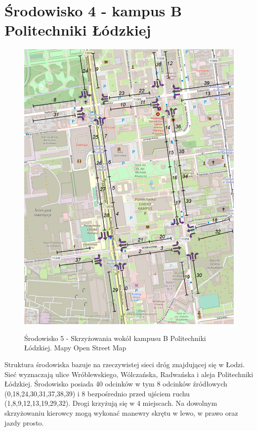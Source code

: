\documentclass[12pt]{book}
\theoremstyle{plain}
\begin{document}
\section{Środowisko 4 - kampus B Politechniki Łódzkiej}
\begin{figure}[H]
	\centering
	\includegraphics[width=12cm]{images/env_poli_italic2}
	\label{fig:env_poli}
	\centering
	\caption{Środowisko 5 - Skrzyżowania wokół kampusu B Politechniki Łódzkiej. Mapy Open Street Map \cite{OpenStreetMap}}
\end{figure}
Struktura środowiska bazuje na rzeczywistej sieci dróg znajdującej się w Łodzi. Sieć wyznaczają ulice Wróblewskiego, Wólczańska, Radwańska i aleja Politechniki Łódzkiej. Środowisko posiada 40 odcinków w tym 8 odcinków źródłowych (0,18,24,30,31,37,38,39) i 8 bezpośrednio przed ujściem ruchu (1,8,9,12,13,19,29,32). Drogi krzyżują się w 4 miejscach. Na dowolnym skrzyżowaniu kierowcy mogą wykonać manewry skrętu w lewo, w prawo oraz jazdy prosto. 
\end{document}

